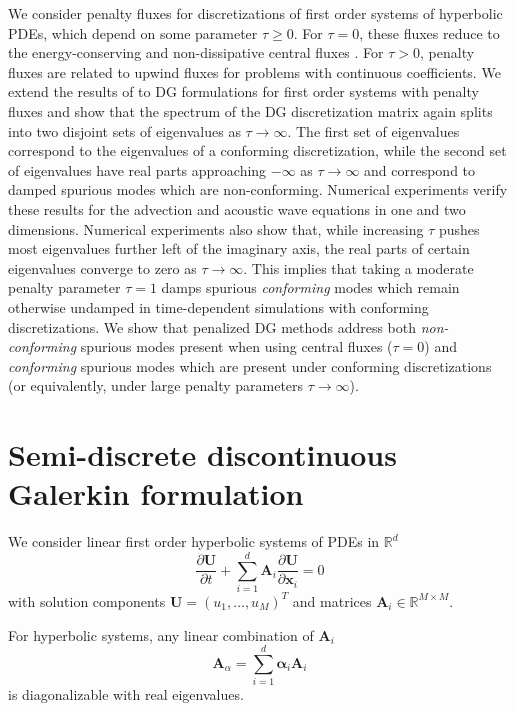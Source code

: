\documentclass[preprint,10pt]{elsarticle}
\newcommand{\pd}[2]{\frac{\partial#1}{\partial#2}}
\newcommand{\note}[1]{#1}
\begin{document}
We consider penalty fluxes for discretizations of first order systems of hyperbolic PDEs, which depend on some parameter $\tau \geq 0$.  For $\tau = 0$, these fluxes reduce to the energy-conserving and non-dissipative central fluxes \cite{fezoui2005convergence}.  For $\tau > 0$, penalty fluxes are related to upwind fluxes for problems with continuous coefficients.  We extend the results of \cite{Warburton20063205} to DG formulations for first order systems with penalty fluxes and show that the \note{spectrum} of the DG discretization matrix again splits into two disjoint sets of eigenvalues as $\tau\rightarrow\infty$.  The first set of eigenvalues correspond to the eigenvalues of a conforming discretization, while the second set of eigenvalues have real parts approaching $-\infty$ as $\tau\rightarrow \infty$ and correspond to damped spurious modes \note{which are non-conforming}.  Numerical experiments verify these results for the advection and acoustic wave equations in one and two dimensions.  Numerical experiments also show that, while increasing $\tau$ pushes most eigenvalues further left of the imaginary axis, the real parts of certain eigenvalues converge to zero as $\tau\rightarrow\infty$.  This implies that taking a moderate penalty parameter $\tau = 1$ damps spurious \note{\emph{conforming}} modes which remain otherwise undamped in time-dependent simulations with conforming discretizations.  \note{We show that penalized DG methods address both \textit{non-conforming} spurious modes present when using central fluxes ($\tau = 0$) and \textit{conforming} spurious modes which are present under conforming discretizations (or equivalently, under large penalty parameters $\tau \rightarrow \infty$).}  

\section{Semi-discrete discontinuous Galerkin formulation}

We consider linear first order hyperbolic systems of PDEs in $\mathbb{R}^d$
\begin{equation}
\pd{\bm{U}}{t} + \sum_{i=1}^d \bm{A}_i\pd{{\bm{U}}}{\bm{x}_i} = 0
\label{eq:cons}
\end{equation}
with solution components $\bm{U} = (u_1, \ldots, u_M)^T$ and matrices $\bm{A}_i \in \mathbb{R}^{M\times M}$.  
\note{
For hyperbolic systems, any linear combination of $\bm{A}_i$ 
\begin{equation}
\bm{A}_{\alpha} = \sum_{i=1}^d \bm{\alpha}_i \bm{A}_i
\label{eq:hyperbolic}
\end{equation}
is diagonalizable with real eigenvalues.  
}
\end{document}
